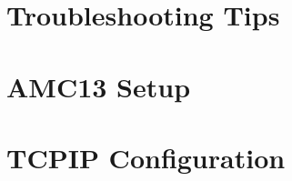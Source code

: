 %


%

\chapter{Troubleshooting Tips}



\appendix


%

\chapter{AMC13 Setup}



\chapter{TCPIP Configuration}




